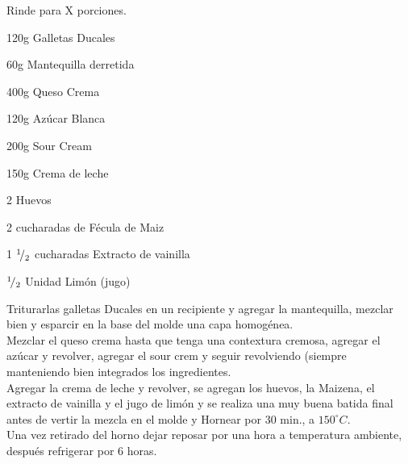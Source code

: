 
Rinde para X porciones.\\

\begin{ingredientes}
\item 120g	Galletas Ducales
\item 60g	Mantequilla derretida
\item 400g	Queso Crema
\item 120g	Azúcar Blanca
\item 200g 	Sour Cream
\item 150g	Crema de leche
\item 2 Huevos
\item 2 cucharadas de Fécula de Maiz
\item 1 ${}^{1}\!/_{2}$ cucharadas Extracto de vainilla
\item ${}^{1}\!/_{2}$ Unidad	Limón (jugo)
\end{ingredientes}
\preparacion

Triturarlas galletas Ducales en un recipiente y agregar la mantequilla, mezclar bien y esparcir en la base del molde una capa homogénea.\\

Mezclar el queso crema hasta que tenga una contextura cremosa, agregar el azúcar y revolver, agregar el sour crem y seguir revolviendo (siempre manteniendo bien integrados los ingredientes.\\

Agregar la crema de leche y revolver, se agregan los huevos, la Maizena, el extracto de vainilla y el jugo de limón y se realiza una muy buena batida final antes de vertir la mezcla en el molde y Hornear por 30 min., a $150^{\circ}C$.\\

Una vez retirado del horno dejar reposar por una hora a temperatura ambiente, después refrigerar por 6 horas.

